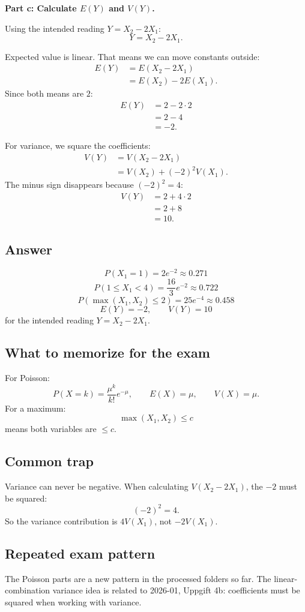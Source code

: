 \documentclass[11pt,a4paper]{article}
\begin{document}
\textbf{Part c: Calculate \(E(Y)\) and \(V(Y)\).}

Using the intended reading \(Y=X_2-2X_1\):
\[
Y=X_2-2X_1.
\]

Expected value is linear. That means we can move constants outside:
\begin{align*}
E(Y)
&=E(X_2-2X_1)\\
&=E(X_2)-2E(X_1).
\end{align*}
Since both means are \(2\):
\begin{align*}
E(Y)
&=2-2\cdot 2\\
&=2-4\\
&=-2.
\end{align*}

For variance, we square the coefficients:
\begin{align*}
V(Y)
&=V(X_2-2X_1)\\
&=V(X_2)+(-2)^2V(X_1).
\end{align*}
The minus sign disappears because \((-2)^2=4\):
\begin{align*}
V(Y)
&=2+4\cdot 2\\
&=2+8\\
&=10.
\end{align*}

\subsection*{Answer}
\[
\boxed{P(X_1=1)=2e^{-2}\approx 0.271}
\]
\[
\boxed{P(1\le X_1<4)=\frac{16}{3}e^{-2}\approx 0.722}
\]
\[
\boxed{P(\max(X_1,X_2)\le 2)=25e^{-4}\approx 0.458}
\]
\[
\boxed{E(Y)=-2,\qquad V(Y)=10}
\]
for the intended reading \(Y=X_2-2X_1\).

\subsection*{What to memorize for the exam}
For Poisson:
\[
P(X=k)=\frac{\mu^k}{k!}e^{-\mu},\qquad E(X)=\mu,\qquad V(X)=\mu.
\]
For a maximum:
\[
\max(X_1,X_2)\le c
\]
means both variables are \(\le c\).

\subsection*{Common trap}
Variance can never be negative. When calculating \(V(X_2-2X_1)\), the \(-2\) must be squared:
\[
(-2)^2=4.
\]
So the variance contribution is \(4V(X_1)\), not \(-2V(X_1)\).

\subsection*{Repeated exam pattern}
The Poisson parts are a new pattern in the processed folders so far. The linear-combination variance idea is related to 2026-01, Uppgift 4b: coefficients must be squared when working with variance.
\end{document}
